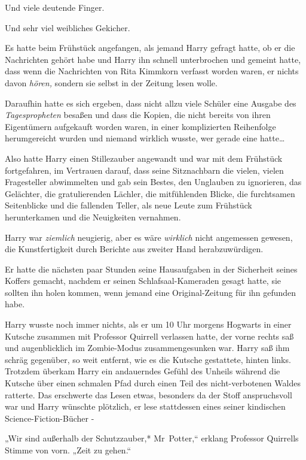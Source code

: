 {Und viele deutende Finger.

Und sehr viel weibliches Gekicher.

Es hatte beim Frühstück angefangen, als jemand Harry gefragt hatte, ob er die Nachrichten gehört habe und Harry ihn schnell unterbrochen und gemeint hatte, dass wenn die Nachrichten von Rita Kimmkorn verfasst worden waren, er nichts davon \emph{hören,} sondern sie selbst in der Zeitung lesen wolle.

Daraufhin hatte es sich ergeben, dass nicht allzu viele Schüler eine Ausgabe des \emph{Tagespropheten} besaßen und dass die Kopien, die nicht bereits von ihren Eigentümern aufgekauft worden waren, in einer komplizierten Reihenfolge herumgereicht wurden und niemand wirklich wusste, wer gerade eine hatte…

Also hatte Harry einen Stillezauber angewandt und war mit dem Frühstück fortgefahren, im Vertrauen darauf, dass seine Sitznachbarn die vielen, vielen Fragesteller abwimmelten und gab sein Bestes, den Unglauben zu ignorieren, das Gelächter, die gratulierenden Lächler, die mitfühlenden Blicke, die furchtsamen Seitenblicke und die fallenden Teller, als neue Leute zum Frühstück herunterkamen und die Neuigkeiten vernahmen.

Harry war \emph{ziemlich} neugierig, aber es wäre \emph{wirklich} nicht angemessen gewesen, die Kunstfertigkeit durch Berichte aus zweiter Hand herabzuwürdigen.

Er hatte die nächsten paar Stunden seine Hausaufgaben in der Sicherheit seines Koffers gemacht, nachdem er seinen Schlafsaal-Kameraden gesagt hatte, sie sollten ihn holen kommen, wenn jemand eine Original-Zeitung für ihn gefunden habe.

Harry wusste noch immer nichts, als er um 10 Uhr morgens Hogwarts in einer Kutsche zusammen mit Professor Quirrell verlassen hatte, der vorne rechts saß und augenblicklich im Zombie-Modus zusammengesunken war. Harry saß ihm schräg gegenüber, so weit entfernt, wie es die Kutsche gestattete, hinten links. Trotzdem überkam Harry ein andauerndes Gefühl des Unheils während die Kutsche über einen schmalen Pfad durch einen Teil des nicht-verbotenen Waldes ratterte. Das erschwerte das Lesen etwas, besonders da der Stoff anspruchsvoll war und Harry wünschte plötzlich, er lese stattdessen eines seiner kindischen Science-Fiction-Bücher -

„Wir sind außerhalb der Schutzzauber,* Mr~Potter,“ erklang Professor Quirrells Stimme von vorn. „Zeit zu gehen.“

}
